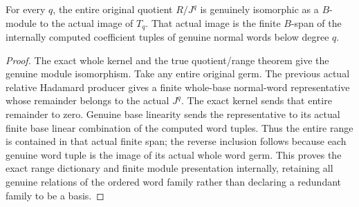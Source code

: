 \begin{theorem}
\label{hir:relative-normal-actual-all-degree-range-presentation}
\leanok
For every $q$, the entire original quotient $R/J^q$ is genuinely isomorphic
as a $B$-module to the actual image of $T_q$. That actual image is the finite
$B$-span of the internally computed coefficient tuples of genuine normal
words below degree $q$.
\end{theorem}
\begin{proof}
The exact whole kernel and the true quotient/range theorem give the genuine
module isomorphism. Take any entire original germ. The previous actual
relative Hadamard producer gives a finite whole-base normal-word representative
whose remainder belongs to the actual $J^q$. The exact kernel sends that
entire remainder to zero. Genuine base linearity sends the representative to
its actual finite base linear combination of the computed word tuples.
Thus the entire range is contained in that actual finite span; the reverse
inclusion follows because each genuine word tuple is the image of its actual
whole word germ. This proves the exact range dictionary and finite module
presentation internally, retaining all genuine relations of the ordered
word family rather than declaring a redundant family to be a basis.
\end{proof}

